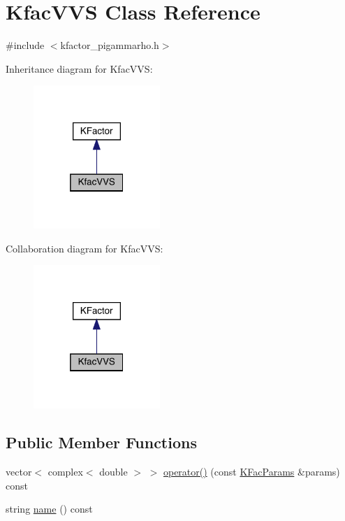 \hypertarget{classKfacVVS}{}\section{Kfac\+V\+VS Class Reference}
\label{classKfacVVS}


{\ttfamily \#include $<$kfactor\+\_\+pigammarho.\+h$>$}



Inheritance diagram for Kfac\+V\+VS\+:\nopagebreak
\begin{figure}[H]
\begin{center}
\leavevmode
\includegraphics[width=136pt]{da/d91/classKfacVVS__inherit__graph}
\end{center}
\end{figure}


Collaboration diagram for Kfac\+V\+VS\+:\nopagebreak
\begin{figure}[H]
\begin{center}
\leavevmode
\includegraphics[width=136pt]{df/d9d/classKfacVVS__coll__graph}
\end{center}
\end{figure}
\subsection*{Public Member Functions}
\begin{DoxyCompactItemize}
\item 
vector$<$ complex$<$ double $>$ $>$ \mbox{\hyperlink{classKfacVVS_ae892df7c0a0595020b968fd9c87be256}{operator()}} (const \mbox{\hyperlink{classKFacParams}{K\+Fac\+Params}} \&params) const
\item 
string \mbox{\hyperlink{classKfacVVS_a2bd46e36671569204826348d5ec6d64a}{name}} () const
\end{DoxyCompactItemize}


